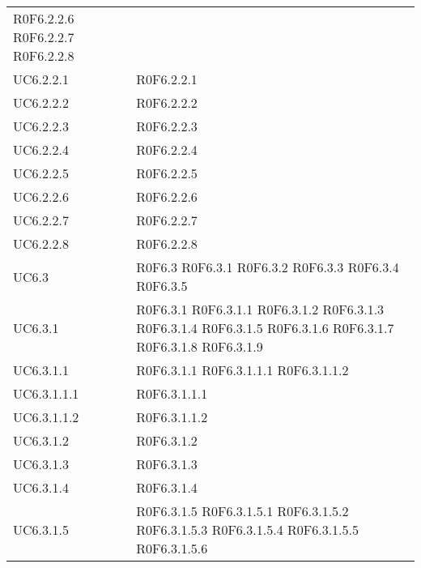 \begin{longtable}{p{2.5cm}!{\VRule[1pt]}p{5.5cm}}
	\newline R0F6.2.2.6
	\newline R0F6.2.2.7
	\newline R0F6.2.2.8\\
UC6.2.2.1 & R0F6.2.2.1\\
UC6.2.2.2 & R0F6.2.2.2\\
UC6.2.2.3 & R0F6.2.2.3\\
UC6.2.2.4 & R0F6.2.2.4\\
UC6.2.2.5 & R0F6.2.2.5\\
UC6.2.2.6 & R0F6.2.2.6\\
UC6.2.2.7 & R0F6.2.2.7\\
UC6.2.2.8 & R0F6.2.2.8\\
UC6.3 & R0F6.3
	\newline R0F6.3.1
	\newline R0F6.3.2
	\newline R0F6.3.3
	\newline R0F6.3.4
	\newline R0F6.3.5\\
UC6.3.1 & R0F6.3.1
	\newline R0F6.3.1.1
	\newline R0F6.3.1.2
	\newline R0F6.3.1.3
	\newline R0F6.3.1.4
	\newline R0F6.3.1.5
	\newline R0F6.3.1.6
	\newline R0F6.3.1.7
	\newline R0F6.3.1.8
	\newline R0F6.3.1.9\\
UC6.3.1.1 & R0F6.3.1.1
	\newline R0F6.3.1.1.1
	\newline R0F6.3.1.1.2\\
UC6.3.1.1.1 & R0F6.3.1.1.1\\
UC6.3.1.1.2 & R0F6.3.1.1.2\\
UC6.3.1.2 & R0F6.3.1.2\\
UC6.3.1.3 & R0F6.3.1.3\\
UC6.3.1.4 & R0F6.3.1.4\\
UC6.3.1.5 & R0F6.3.1.5
	\newline R0F6.3.1.5.1
	\newline R0F6.3.1.5.2
	\newline R0F6.3.1.5.3
	\newline R0F6.3.1.5.4
	\newline R0F6.3.1.5.5
	\newline R0F6.3.1.5.6

\end{longtable}
